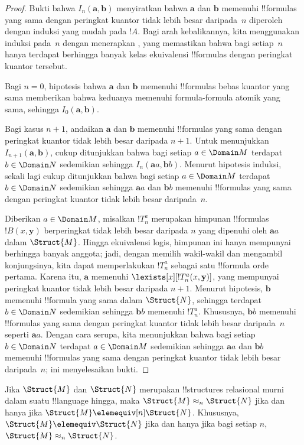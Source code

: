 \documentclass[../../../include/open-logic-section]{subfiles}
\begin{document}
\begin{proof}
  Bukti bahwa $I_n(\mathbf{a},\mathbf{b})$ menyiratkan bahwa $\mathbf{a}$
  dan $\mathbf{b}$ memenuhi !!{formula}s yang sama dengan peringkat kuantor
  tidak lebih besar daripada~$n$ diperoleh dengan induksi yang mudah pada
  $!A$. Bagi arah kebalikannya, kita menggunakan induksi pada~$n$ dengan
  menerapkan , yang memastikan bahwa bagi setiap~$n$
  hanya terdapat berhingga banyak kelas ekuivalensi !!{formula}s dengan
  peringkat kuantor tersebut.

  Bagi $n=0$, hipotesis bahwa $\mathbf{a}$ dan $\mathbf{b}$ memenuhi
  !!{formula}s bebas kuantor yang sama memberikan bahwa keduanya memenuhi
  formula-formula atomik yang sama, sehingga $I_0(\mathbf{a},\mathbf{b})$.

  Bagi kasus $n+1$, andaikan $\mathbf{a}$ dan $\mathbf{b}$ memenuhi
  !!{formula}s yang sama dengan peringkat kuantor tidak lebih besar daripada
  $n+1$. Untuk menunjukkan $I_{n+1}(\mathbf{a},\mathbf{b})$, cukup ditunjukkan
  bahwa bagi setiap $a \in \Domain M$ terdapat $b \in \Domain N$ sedemikian
  sehingga $I_n(\mathbf{a}a,\mathbf{b}b)$. Menurut hipotesis induksi, sekali
  lagi cukup ditunjukkan bahwa bagi setiap $a \in \Domain M$ terdapat
  $b \in \Domain N$ sedemikian sehingga $\mathbf{a}a$ dan $\mathbf{b}b$
  memenuhi !!{formula}s yang sama dengan peringkat kuantor tidak lebih besar
  daripada~$n$.

  Diberikan $a \in \Domain M$, misalkan $!T^a_n$ merupakan himpunan
  !!{formula}s $!B(x,\mathbf{y})$ berperingkat tidak lebih besar daripada
  $n$ yang dipenuhi oleh $\mathbf{a}a$ dalam $\Struct{M}$. Hingga ekuivalensi
  logis, himpunan ini hanya mempunyai berhingga banyak anggota; jadi, dengan
  memilih wakil-wakil dan mengambil konjungsinya, kita dapat memperlakukan
  $!T^a_n$ sebagai satu !!{formula} orde pertama. Karena itu,
  $\mathbf{a}$ memenuhi $\lexists[x][!T^a_n(x,\mathbf{y})]$, yang mempunyai
  peringkat kuantor tidak lebih besar daripada $n+1$. Menurut hipotesis,
  $\mathbf{b}$ memenuhi !!{formula} yang sama dalam $\Struct{N}$, sehingga
  terdapat $b \in \Domain N$ sedemikian sehingga $\mathbf{b}b$ memenuhi
  $!T^a_n$. Khususnya, $\mathbf{b}b$ memenuhi !!{formula}s yang sama dengan
  peringkat kuantor tidak lebih besar daripada~$n$ seperti $\mathbf{a}a$.
  Dengan cara serupa, kita menunjukkan bahwa bagi setiap $b \in \Domain N$
  terdapat $a\in \Domain M$ sedemikian sehingga $\mathbf{a}a$ dan
  $\mathbf{b}b$ memenuhi !!{formula}s yang sama dengan peringkat kuantor
  tidak lebih besar daripada~$n$; ini menyelesaikan bukti.
\end{proof}

\begin{cor}
  Jika $\Struct{M}$ dan $\Struct{N}$ merupakan !!{structure}s relasional
  murni dalam suatu !!{language} hingga, maka $\Struct{M} \approx_n
  \Struct{N}$ jika dan hanya jika $\Struct{M} \elemequiv[n] \Struct{N}$.
  Khususnya, $\Struct{M} \elemequiv \Struct{N}$ jika dan hanya jika bagi
  setiap $n$, $\Struct{M} \approx_n \Struct{N}$.
\end{cor}
\end{document}
